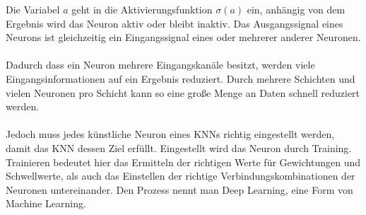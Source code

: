 \documentclass[12pt,oneside,a4paper,parskip]{scrbook}
\begin{document}
Die Variabel $a$ geht in die Aktivierungsfunktion ${\sigma (a)}$ ein, anhängig von dem Ergebnis wird das Neuron aktiv oder bleibt inaktiv.
Das Ausgangssignal eines Neurons ist gleichzeitig ein Eingangssignal eines oder mehrerer anderer Neuronen. %
\\\\
Dadurch dass ein Neuron mehrere Eingangskanäle besitzt, werden viele Eingangsinformationen auf ein Ergebnis reduziert. Durch mehrere Schichten und vielen Neuronen pro Schicht kann so eine große Menge an Daten schnell reduziert werden.
\\\\
Jedoch muss jedes künstliche Neuron eines KNNs richtig eingestellt werden, damit das KNN dessen Ziel erfüllt. Eingestellt wird das Neuron durch Training. Trainieren bedeutet hier das Ermitteln der richtigen Werte für Gewichtungen und Schwellwerte, als auch das Einstellen der richtige Verbindungskombinationen der Neuronen untereinander. Den Prozess nennt man Deep Learning, eine Form von Machine Learning.
\end{document}
